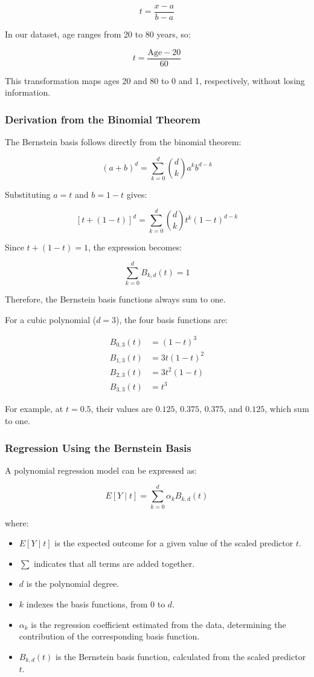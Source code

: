 \documentclass[
  letterpaper,
  DIV=11,
  numbers=noendperiod]{scrreprt}
\providecommand{\tightlist}{%
  \setlength{\itemsep}{0pt}\setlength{\parskip}{0pt}}
\begin{document}
\[
t=\frac{x-a}{b-a}
\]

In our dataset, age ranges from 20 to 80 years, so:

\[
t=\frac{\text{Age}-20}{60}
\]

This transformation maps ages 20 and 80 to 0 and 1, respectively,
without losing information.

\subsubsection{Derivation from the Binomial
Theorem}\label{derivation-from-the-binomial-theorem}

The Bernstein basis follows directly from the binomial theorem:

\[
(a+b)^d=\sum_{k=0}^{d}\binom{d}{k}a^kb^{d-k}
\]

Substituting \(a=t\) and \(b=1-t\) gives:

\[
[t+(1-t)]^d
=
\sum_{k=0}^{d}\binom{d}{k}t^k(1-t)^{d-k}
\]

Since \(t+(1-t)=1\), the expression becomes:

\[
\sum_{k=0}^{d}B_{k,d}(t)=1
\]

Therefore, the Bernstein basis functions always sum to one.

For a cubic polynomial (\(d=3\)), the four basis functions are:

\[
\begin{aligned}
B_{0,3}(t)&=(1-t)^3\\
B_{1,3}(t)&=3t(1-t)^2\\
B_{2,3}(t)&=3t^2(1-t)\\
B_{3,3}(t)&=t^3
\end{aligned}
\]

For example, at \(t=0.5\), their values are \(0.125\), \(0.375\),
\(0.375\), and \(0.125\), which sum to one.

\subsubsection{Regression Using the Bernstein
Basis}\label{regression-using-the-bernstein-basis}

A polynomial regression model can be expressed as:

\[
\boxed{
E[Y\mid t]=\sum_{k=0}^{d}\alpha_k B_{k,d}(t)
}
\]

where:

\begin{itemize}
\tightlist
\item
  \(E[Y\mid t]\) is the expected outcome for a given value of the scaled
  predictor \(t\).
\item
  \(\sum\) indicates that all terms are added together.
\item
  \(d\) is the polynomial degree.
\item
  \(k\) indexes the basis functions, from \(0\) to \(d\).
\item
  \(\alpha_k\) is the regression coefficient estimated from the data,
  determining the contribution of the corresponding basis function.
\item
  \(B_{k,d}(t)\) is the Bernstein basis function, calculated from the
  scaled predictor \(t\).
\end{itemize}
\end{document}
